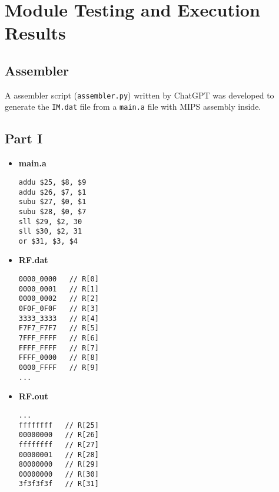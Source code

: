 \documentclass[12pt]{article}
\begin{document}

\section{Module Testing and Execution Results}



\subsection*{Assembler}
A assembler script (\texttt{assembler.py}) written by ChatGPT was developed to generate the \texttt{IM.dat} file from a \texttt{main.a} file with MIPS assembly inside.

\subsection*{Part I}

\begin{itemize}
    \item 
\textbf{main.a}
\begin{lstlisting}[language={}, frame=single]
addu $25, $8, $9
addu $26, $7, $1
subu $27, $0, $1
subu $28, $0, $7
sll $29, $2, 30
sll $30, $2, 31
or $31, $3, $4
\end{lstlisting}

\item 
\textbf{RF.dat}
\begin{lstlisting}[language={}]
0000_0000   // R[0]
0000_0001   // R[1]
0000_0002   // R[2]
0F0F_0F0F   // R[3]
3333_3333   // R[4]
F7F7_F7F7   // R[5]
7FFF_FFFF   // R[6]
FFFF_FFFF   // R[7]
FFFF_0000   // R[8]
0000_FFFF   // R[9]
...
\end{lstlisting}

\item 
\textbf{RF.out}
\begin{lstlisting}[language={}]
...
ffffffff   // R[25]
00000000   // R[26]
ffffffff   // R[27]
00000001   // R[28]
80000000   // R[29]
00000000   // R[30]
3f3f3f3f   // R[31]
\end{lstlisting}
\end{itemize}
\end{document}
